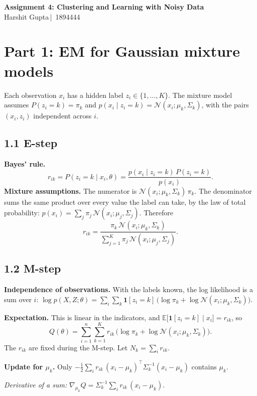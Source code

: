\documentclass[11pt]{article}
\newcommand{\studentname}{Harshit Gupta}
\newcommand{\studentid}{1894444}
\newcommand{\N}{\mathcal{N}}
\begin{document}
\begin{center}
  {\LARGE\bfseries Assignment 4: Clustering and Learning with Noisy Data}\\[0.4em]
  \studentname \,|\, \studentid
\end{center}

\section*{Part 1: EM for Gaussian mixture models}

Each observation $x_i$ has a hidden label $z_i\in\{1,\dots,K\}$. The mixture model
assumes $P(z_i=k)=\pi_k$ and $p(x_i\mid z_i=k)=\N(x_i;\mu_k,\Sigma_k)$, with the pairs
$(x_i,z_i)$ independent across $i$.

\subsection*{1.1 E-step}

\textbf{Bayes' rule.}
\[
r_{ik}=P(z_i=k\mid x_i,\theta)=\frac{p(x_i\mid z_i=k)\,P(z_i=k)}{p(x_i)}.
\]
\textbf{Mixture assumptions.} The numerator is $\N(x_i;\mu_k,\Sigma_k)\,\pi_k$. The
denominator sums the same product over every value the label can take, by the law of
total probability: $p(x_i)=\sum_{j}\pi_j\,\N(x_i;\mu_j,\Sigma_j)$. Therefore
\[
r_{ik}=\frac{\pi_k\,\N(x_i;\mu_k,\Sigma_k)}{\sum_{j=1}^{K}\pi_j\,\N(x_i;\mu_j,\Sigma_j)}.
\]

\subsection*{1.2 M-step}

\textbf{Independence of observations.} With the labels known, the log likelihood is a sum
over $i$: $\log p(X,Z;\theta)=\sum_i\sum_k\mathbf{1}[z_i=k]\,
\bigl(\log\pi_k+\log\N(x_i;\mu_k,\Sigma_k)\bigr)$.

\textbf{Expectation.} This is linear in the indicators, and
$\mathbb{E}\bigl[\mathbf{1}[z_i=k]\mid x_i\bigr]=r_{ik}$, so
\[
Q(\theta)=\sum_{i=1}^{n}\sum_{k=1}^{K}r_{ik}\,\bigl(\log\pi_k+\log\N(x_i;\mu_k,\Sigma_k)\bigr).
\]
The $r_{ik}$ are fixed during the M-step. Let $N_k=\sum_i r_{ik}$.

\textbf{Update for $\mu_k$.} Only
$-\tfrac12\sum_i r_{ik}\,(x_i-\mu_k)^{\!\top}\Sigma_k^{-1}(x_i-\mu_k)$ contains $\mu_k$.

\emph{Derivative of a sum:}
$\nabla_{\mu_k}Q=\Sigma_k^{-1}\sum_i r_{ik}\,(x_i-\mu_k)$.
\end{document}
